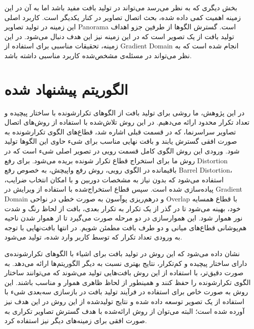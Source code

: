 بخش دیگری که به نظر می‌رسد می‌تواند در تولید بافت مفید باشد اما به آن در این زمینه اهمیت کمی داده شده، بحث اتصال تصاویر در کنار یکدیگر است. کاربرد اصلی این زمینه در تولید تصاویر \gls{Panorama} است. گسترش الگو‌ها از طرفین جزو اهداف تولید بافت از یک تصویر است که در این زمینه نیز این هدف دنبال می‌شود. در این زمینه، تحقیقات مناسبی برای استفاده از \gls{Gradient Domain}\cite{Levin2004SeamlessIS}\cite{Paul2016MultiExposureAM} انجام شده است که به نظر می‌تواند در مسئله‌ی مشخص‌شده کاربرد مناسبی داشته باشد.
\section{الگوریتم پیشنهاد شده}
در این پژوهش، ما روشی برای تولید بافت از الگو‌های تکرارشونده با ساختار پیچیده و تعداد تکرار محدود ارائه می‌دهیم. در این روش تلاش‌شده با استفاده از روش‌های اتصال تصاویر سراسرنما، که در قسمت قبلی اشاره شد، قطاع‌های الگو‌ی تکرارشونده به صورت افقی گسترش یابند و بافت نهایی مناسب برای شیء حاوی این الگو‌ها تولید شود. ورودی این روش الگوی کامل قسمت رویی در تصویر اصلی شیء است که در روش ما برای استخراج قطاع تکرار شونده بریده می‌شود. برای رفع \gls{Distortion} باقیمانده در الگوی رویی، روش رفع واپیچش، به خصوص رفع \gls{Barrel Distortion}، استفاده می‌شود که بدون نیاز به مشخصات دوربین و با امکان انتخاب ضرایب، پیاده‌سازی شده است. سپس قطاع استخراج‌شده با استفاده از ویرایش در \gls{Gradient Domain}\cite{GradientShop} و در‌هم‌ریزی پوآسون\cite{PoissonImageEditing} به صورت خطی در نواحی \gls{Overlap} با قطاع همسایه خود، بهینه می‌شود تا در گذر از یک تکرار به تکرار بعدی، بافت از لحاظ رنگ و شدت نور هموار شود. این هموارسازی در دو مرحله صورت می‌گیرد تا از هموار شدن ناحیه هم‌پوشانی قطاع‌های میانی و دو طرف بافت مطمئن شویم. در انتها بافت‌نهایی با توجه به ورودی تعداد تکرار که توسط کاربر وارد شده، تولید می‌شود.

نشان داده می‌شود که این روش در تولید بافت برای اشیاء با الگوهای تکرار‌شونده‌ی دارای ساختار پیچیده و کم‌تکرار، نتایج بهتری نسبت به دیگر الگوریتم‌ها ارائه می‌دهد. به صورت دقیق‌تر، با استفاده از این روش بافت‌هایی تولید می‌شوند که می‌توانند ساختار الگوی تکرارشونده را حفظ کنند و همینطور از لحاظ ظاهری هموار و مناسب باشند. این روش به صورت خاص برای استفاده در فرآیند تولید بافت در بازسازی سه‌بعدی‌ شیء با استفاده از یک تصویر توسعه داده ‌شده و نتایج تولید‌شده از این روش در این هدف نیز آورده شده است؛ البته می‌توان از روش ارائه‌شده با هدف گسترش تصاویر تکراری به صورت افقی برای زمینه‌های دیگر نیز استفاده کرد.


